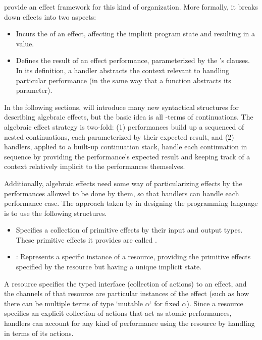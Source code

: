  provide an effect framework for this kind of organization.
More formally, it breaks down effects into two aspects:
%
\begin{itemize}
\item
  Incurs the  of an effect, affecting the implicit program state and resulting in a value.
\item
  Defines the result of an effect performance, parameterized by the 's clauses.
  In its definition, a handler abstracts the context relevant to handling particular performance (in the same way that a function abstracts its parameter).
\end{itemize}
%
In the following sections, \LangD will introduce many new syntactical structures for describing algebraic effects, but the basic idea is all \LangA-terms of continuations.
The algebraic effect strategy is two-fold:
(1) performances build up a sequenced of nested continuations, each parameterized by their expected result, and
(2) handlers, applied to a built-up continuation stack, handle each continuation in sequence by providing the performance's expected result and keeping track of a context relatively implicit to the performances themselves.

Additionally, algebraic effects need some way of particularizing effects by the performances allowed to be done by them, so that handlers can handle each performance case.
The approach taken by \cite{Bauer2015ProgrammingWA} in designing the  programming language is to use the following structures.
\begin{itemize}
\item
  Specifies a collection of primitive effects by their input and output types.
  These primitive effects it provides are called .
\item
  :
  Represents a specific instance of a resource, providing the primitive effects specified by the resource but having a unique implicit state.
\end{itemize}
A resource specifies the typed interface (collection of actions) to an effect, and
the channels of that resource are particular instances of the effect
(such as how there can be multiple terms of type \code`mutable $α$` for fixed $α$).
Since a resource specifies an explicit collection of actions that act as atomic performances, handlers can account for any kind of performance using the resource by handling in terms of its actions.

